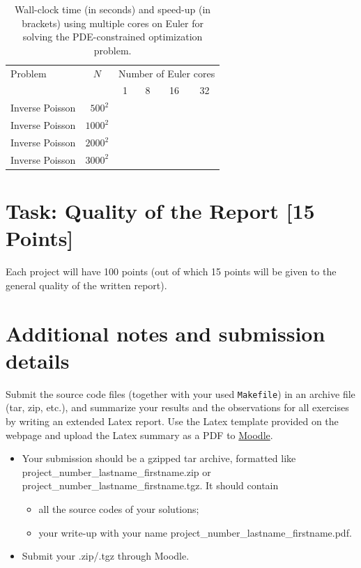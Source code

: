 \documentclass[unicode,11pt,a4paper,oneside,numbers=endperiod,openany]{scrartcl}
\begin{document}
\begin{table}[h]
  \caption{Wall-clock time (in seconds) and speed-up (in brackets) using multiple cores on Euler for solving the PDE-constrained optimization problem.}
	\centering
	
	\medskip
	
	\begin{tabular}{l|r||r|r|r|r}\hline\hline
		Problem & \multicolumn{1}{c||}{$N$} &  \multicolumn{4}{c}{Number of Euler cores} \\
		&       & \multicolumn{1}{c|}{1} & \multicolumn{1}{c|}{8} & \multicolumn{1}{c|}{16} & \multicolumn{1}{c}{32} \\
		\hline\hline
		{ Inverse Poisson} & $500^2$  &    \phantom{222222}        &    \phantom{222222}      & \phantom{222222}         &      \phantom{222222} \\
		{ Inverse  Poisson} & $1000^2$ &            &          &          &       \\
		{ Inverse Poisson} & $2000^2$ &            &          &          &       \\
		{ Inverse Poisson} & $3000^2$ &            &          &          &       \\\hline \hline
	\end{tabular}
	
	\label{tab:PDEparallel}
\end{table}

\section{Task:  Quality of the Report [15 Points]}
Each project will have 100 points (out of  which 15 points will be given to the general quality of the written report).


\section*{Additional notes and submission details}
Submit the source code files (together with your used \texttt{Makefile}) in
an archive file (tar, zip, etc.), and summarize your results and the
observations for all exercises by writing an extended Latex report.
Use the Latex template provided on the webpage and upload the Latex summary
as a PDF to \href{https://moodle-app2.let.ethz.ch/course/view.php?id=14316}{Moodle}.

\begin{itemize}
	\item Your submission should be a gzipped tar archive, formatted like project\_number\_lastname\_firstname.zip or project\_number\_lastname\_firstname.tgz. 
	It should contain
	\begin{itemize}
		\item all the source codes of your solutions;
		\item your write-up with your name  project\_number\_lastname\_firstname.pdf.
	\end{itemize}
	\item Submit your .zip/.tgz through Moodle.
\end{itemize}
\end{document}
